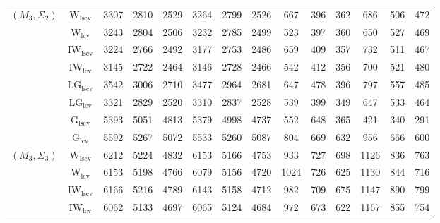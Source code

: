 \begin{table}[!ht]
{\begin{tabular}{@{}cc|ccc|ccc|ccc|ccc@{}}
\midrule
$(M_3,\Sigma_2)$ & $\mathrm{W}_{\mathrm{lscv}}$ & 3307 & 2810 & 2529 & 3264 & 2799 & 2526 & 667 & \cellcolor{black!30}396 & 362 & 686 & \cellcolor{black!10}506 & 472 \\ 
 & $\mathrm{W}_{\mathrm{lcv}}$ & 3243 & 2804 & 2506 & 3232 & 2785 & 2499 & \cellcolor{black!30}523 & \cellcolor{black!10}397 & 360 & 650 & 527 & 469 \\ 
 & $\mathrm{IW}_{\mathrm{lscv}}$ & \cellcolor{black!10}3224 & \cellcolor{black!10}2766 & \cellcolor{black!10}2492 & \cellcolor{black!10}3177 & \cellcolor{black!10}2753 & \cellcolor{black!10}2486 & 659 & 409 & 357 & 732 & 511 & 467 \\ 
 & $\mathrm{IW}_{\mathrm{lcv}}$ & \cellcolor{black!30}3145 & \cellcolor{black!30}2722 & \cellcolor{black!30}2464 & \cellcolor{black!30}3146 & \cellcolor{black!30}2728 & \cellcolor{black!30}2466 & 542 & 412 & \cellcolor{black!10}356 & 700 & 521 & 480 \\ 
 & $\mathrm{LG}_{\mathrm{lscv}}$ & 3542 & 3006 & 2710 & 3477 & 2964 & 2681 & 647 & 478 & 396 & 797 & 557 & 485 \\ 
 & $\mathrm{LG}_{\mathrm{lcv}}$ & 3321 & 2829 & 2520 & 3310 & 2837 & 2528 & \cellcolor{black!10}539 & 399 & \cellcolor{black!30}349 & \cellcolor{black!10}647 & 533 & \cellcolor{black!10}464 \\ 
 & $\mathrm{G}_{\mathrm{lscv}}$ & 5393 & 5051 & 4813 & 5379 & 4998 & 4737 & 552 & 648 & 365 & \cellcolor{black!30}421 & \cellcolor{black!30}340 & \cellcolor{black!30}291 \\ 
 & $\mathrm{G}_{\mathrm{lcv}}$ & 5592 & 5267 & 5072 & 5533 & 5260 & 5087 & 804 & 669 & 632 & 956 & 666 & 600 \\ 
\midrule
$(M_3,\Sigma_3)$ & $\mathrm{W}_{\mathrm{lscv}}$ & 6212 & 5224 & 4832 & 6153 & 5166 & 4753 & \cellcolor{black!10}933 & 727 & 698 & 1126 & 836 & 763 \\ 
 & $\mathrm{W}_{\mathrm{lcv}}$ & \cellcolor{black!10}6153 & \cellcolor{black!10}5198 & \cellcolor{black!10}4766 & \cellcolor{black!10}6079 & \cellcolor{black!10}5156 & 4720 & 1024 & 726 & 625 & 1130 & 844 & 716 \\ 
 & $\mathrm{IW}_{\mathrm{lscv}}$ & 6166 & 5216 & 4789 & 6143 & 5158 & \cellcolor{black!10}4712 & 982 & 709 & 675 & 1147 & 890 & 799 \\ 
 & $\mathrm{IW}_{\mathrm{lcv}}$ & \cellcolor{black!30}6062 & \cellcolor{black!30}5133 & \cellcolor{black!30}4697 & \cellcolor{black!30}6065 & \cellcolor{black!30}5124 & \cellcolor{black!30}4684 & 972 & \cellcolor{black!10}673 & \cellcolor{black!10}622 & 1167 & 855 & 754 \\ 

\end{tabular}}
\end{table}
